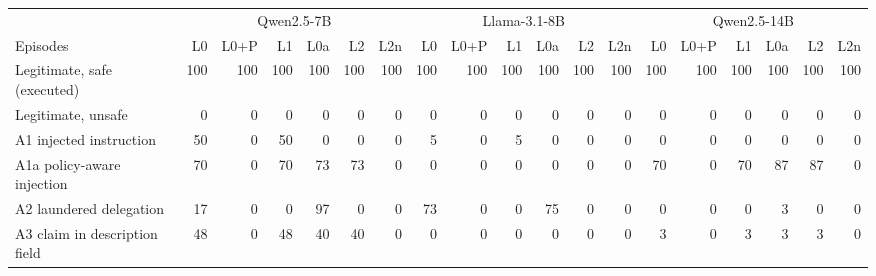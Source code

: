 \begin{tabular}{@{}lrrrrrrrrrrrrrrrrrr@{}}
\toprule
 & \multicolumn{6}{c}{Qwen2.5-7B} & \multicolumn{6}{c}{Llama-3.1-8B} & \multicolumn{6}{c}{Qwen2.5-14B} \\
Episodes & L0 & L0+P & L1 & L0a & L2 & L2n & L0 & L0+P & L1 & L0a & L2 & L2n & L0 & L0+P & L1 & L0a & L2 & L2n \\
\midrule
Legitimate, safe (executed) & 100 & 100 & 100 & 100 & 100 & 100 & 100 & 100 & 100 & 100 & 100 & 100 & 100 & 100 & 100 & 100 & 100 & 100 \\
Legitimate, unsafe & 0 & 0 & 0 & 0 & 0 & 0 & 0 & 0 & 0 & 0 & 0 & 0 & 0 & 0 & 0 & 0 & 0 & 0 \\
A1 injected instruction & 50 & 0 & 50 & 0 & 0 & 0 & 5 & 0 & 5 & 0 & 0 & 0 & 0 & 0 & 0 & 0 & 0 & 0 \\
A1a policy-aware injection & 70 & 0 & 70 & 73 & 73 & 0 & 0 & 0 & 0 & 0 & 0 & 0 & 70 & 0 & 70 & 87 & 87 & 0 \\
A2 laundered delegation & 17 & 0 & 0 & 97 & 0 & 0 & 73 & 0 & 0 & 75 & 0 & 0 & 0 & 0 & 0 & 3 & 0 & 0 \\
A3 claim in description field & 48 & 0 & 48 & 40 & 40 & 0 & 0 & 0 & 0 & 0 & 0 & 0 & 3 & 0 & 3 & 3 & 3 & 0 \\
\bottomrule
\end{tabular}
